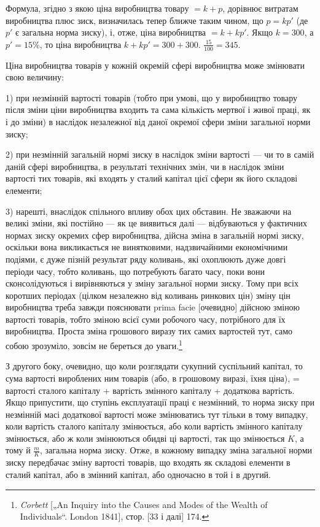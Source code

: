 
Формула, згідно з якою ціна виробництва товару $= k + p$,
дорівнює витратам виробництва плюс зиск, визначилась тепер
ближче таким чином, що $p = kp'$ (де $p'$ є загальна норма зиску),
і, отже, ціна виробництва $= k + kp'$. Якщо $k = 300$, а $p' = 15\%$,
то ціна виробництва $k + kp' = 300 + 300$. $\frac{15}{100} = 345$.

Ціна виробництва товарів у кожній окремій сфері виробництва може змінювати свою величину:

1) при незмінній вартості товарів (тобто при умові, що у виробництво товару після зміни ціни
виробництва входить та сама
кількість мертвої і живої праці, як і до зміни) в наслідок незалежної від даної окремої сфери зміни
загальної норми зиску;

2) при незмінній загальній нормі зиску в наслідок зміни вартості — чи то в самій даній сфері
виробництва, в результаті
технічних змін, чи в наслідок зміни вартості тих товарів, які
входять у сталий капітал цієї сфери як його складові елементи;

3) нарешті, внаслідок спільного впливу обох цих обставин.
Не зважаючи на великі зміни, які постійно — як це виявиться
далі — відбуваються у фактичних нормах зиску окремих сфер
виробництва, дійсна зміна в загальній нормі зиску, оскільки
вона викликається не винятковими, надзвичайними економічними
подіями, є дуже пізній результат ряду коливань, які охоплюють
дуже довгі періоди часу, тобто коливань, що потребують багато часу, поки вони сконсолідуються і
вирівняються у зміну
загальної норми зиску. Тому при всіх коротших періодах (цілком незалежно від коливань ринкових цін)
зміну цін виробництва
треба завжди пояснювати prima facie [очевидно] дійсною зміною
вартості товарів, тобто зміною всієї суми робочого часу, потрібного для їх виробництва. Проста зміна
грошового виразу тих самих вартостей тут, само собою зрозуміло, зовсім не береться до уваги.\footnote{
\emph{Corbett} [„An Inquiry into the Causes and Modes of the Wealth of Individuals“.
London 1841], стор. [33 і далі] 174.
}

З другого боку, очевидно, що коли розглядати сукупний
суспільний капітал, то сума вартості вироблених ним товарів
(або, в грошовому виразі, їхня ціна), = вартості сталого капіталу + вартість змінного капіталу +
додаткова вартість. Якщо припустити, що ступінь експлуатації праці є незмінний, то норма зиску
при незмінній масі додаткової вартості може змінюватись тут
тільки в тому випадку, коли вартість сталого капіталу змінюється,
або коли вартість змінного капіталу змінюється, або ж коли змінюються обидві ці вартості, так що
змінюється $K$, а тому й $\frac{m}{K}$, загальна норма зиску. Отже, в кожному випадку зміна загальної
норми зиску передбачає зміну вартості товарів, що входять як
складові елементи в сталий капітал, або в змінний капітал, або
одночасно в той і в другий.
